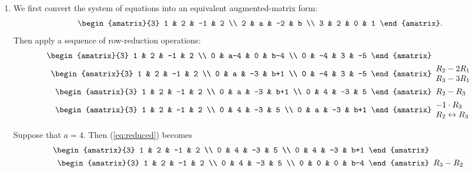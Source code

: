 \documentclass{article}
\begin{document}
\begin{enumerate}
\item
We first convert the system of equations into an equivalent augmented-matrix
form:
\[
 \begin{amatrix}{3}
  1 & 2 & -1 & 2 \\
  2 & a & -2 & b \\
  3 & 2 & 0 & 1
 \end{amatrix}.
\]
Then apply a sequence of row-reduction operations:
\begin{align}
 \begin{amatrix}{3}
  1 &   2 & -1 &   2 \\
  0 & a-4 &  0 & b-4 \\
  0 &  -4 &  3 &  -5
 \end{amatrix} &  \nonumber \\
 \begin{amatrix}{3}
  1 &  2 & -1 &   2 \\
  0 &  a & -3 & b+1 \\
  0 & -4 &  3 &  -5
 \end{amatrix} & \begin{array}{l} R_2 - 2R_1 \\ R_3 - 3R_1 \end{array} 
 \nonumber \\
 \begin{amatrix}{3}
  1 & 2 & -1 &   2 \\
  0 & a & -3 & b+1 \\
  0 & 4 & -3 &   5
 \end{amatrix} &  \begin{array}{l} R_2 - R_3 \end{array}
 \nonumber \\
 \begin{amatrix}{3}
  1 & 2 & -1 &   2 \\
  0 & 4 & -3 &   5 \\
  0 & a & -3 & b+1
 \end{amatrix} &\begin{array}{l} -1 \cdot R_3 \\ R_2 \leftrightarrow R_3 \end{array}
 \label{eq:reduced}
\end{align}

Suppose that $a = 4$.  Then (\ref{eq:reduced}) becomes
\begin{align}
 \begin{amatrix}{3}
  1 & 2 & -1 &   2 \\
  0 & 4 & -3 &   5 \\
  0 & 4 & -3 & b+1
 \end{amatrix} &
 \nonumber \\
 \begin{amatrix}{3}
  1 & 2 & -1 &   2 \\
  0 & 4 & -3 &   5 \\
  0 & 0 &  0 & b-4
 \end{amatrix}&  \begin{array}{l} R_3 - R_2 \end{array}
 \label{eq:substitute_a}
\end{align}


\end{enumerate}
\end{document}
